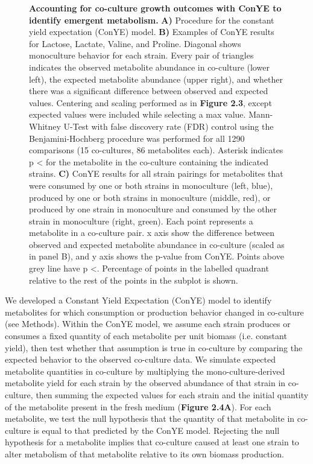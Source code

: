 \documentclass[11pt,onecolumn,notitlepage,openany,twoside]{book}
\begin{document}
\begin{refsection}
\begin{figure}[tb!]
\caption[Accounting for co-culture growth outcomes with ConYE to identify emergent metabolism.]{\textbf{Accounting for co-culture growth outcomes with ConYE to identify emergent metabolism.} \textbf{A)} Procedure for the constant yield expectation (ConYE) model. \textbf{B)} Examples of ConYE results for Lactose, Lactate, Valine, and Proline. Diagonal shows monoculture behavior for each strain. Every pair of triangles indicates the observed metabolite abundance in co-culture (lower left), the expected metabolite abundance (upper right), and whether there was a significant difference between observed and expected values. Centering and scaling performed as in \textbf{Figure 2.3}, except expected values were included while selecting a max value. Mann-Whitney U-Test with false discovery rate (FDR) control using the Benjamini-Hochberg procedure was performed for all 1290 comparisons (15 co-cultures, 86 metabolites each). Asterisk indicates p \textless{} for the metabolite in the co-culture containing the indicated strains. \textbf{C)} ConYE results for all strain pairings for metabolites that were consumed by one or both strains in monoculture (left, blue), produced by one or both strains in monoculture (middle, red), or produced by one strain in monoculture and consumed by the other strain in monoculture (right, green). Each point represents a metabolite in a co-culture pair. x axis show the difference between observed and expected metabolite abundance in co-culture (scaled as in panel B), and y axis shows the p-value from ConYE. Points above grey line have p \textless{}. Percentage of points in the labelled quadrant relative to the rest of the points in the subplot is shown.}
\end{figure}

We developed a Constant Yield Expectation (ConYE) model to identify metabolites for which consumption or production behavior changed in co-culture (see Methods). Within the ConYE model, we assume each strain produces or consumes a fixed quantity of each metabolite per unit biomass (i.e. constant yield), then test whether that assumption is true in co-culture by comparing the expected behavior to the observed co-culture data. We simulate expected metabolite quantities in co-culture by multiplying the mono-culture-derived metabolite yield for each strain by the observed abundance of that strain in co-culture, then summing the expected values for each strain and the initial quantity of the metabolite present in the fresh medium (\textbf{Figure 2.4A}). For each metabolite, we test the null hypothesis that the quantity of that metabolite in co-culture is equal to that predicted by the ConYE model. Rejecting the null hypothesis for a metabolite implies that co-culture caused at least one strain to alter metabolism of that metabolite relative to its own biomass production.


\end{refsection}
\end{document}
